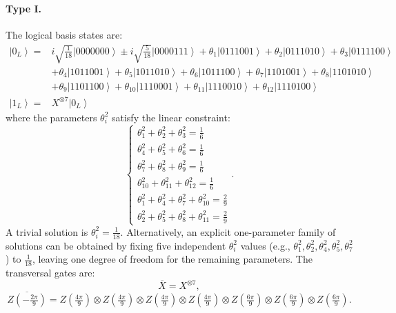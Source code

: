 \documentclass[8pt]{article}
\theoremstyle{definition}
\begin{document}
\paragraph{Type I.} The logical basis states are:
\begin{align*}
    \left|0_{L}\right\rangle = & i\sqrt{\frac{1}{18}}\left|0000000\right\rangle \pm i\sqrt{\frac{5}{18}}\left|0000111\right\rangle +\theta_{1}\left|0111001\right\rangle +\theta_{2}\left|0111010\right\rangle +\theta_{3}\left|0111100\right\rangle \\&+\theta_{4}\left|1011001\right\rangle +\theta_{5}\left|1011010\right\rangle +\theta_{6}\left|1011100\right\rangle +\theta_{7}\left|1101001\right\rangle +\theta_{8}\left|1101010\right\rangle \\
                               & +\theta_{9}\left|1101100\right\rangle +\theta_{10}\left|1110001\right\rangle +\theta_{11}\left|1110010\right\rangle +\theta_{12}\left|1110100\right\rangle                                                          \\
    \left|1_{L}\right\rangle = & X^{\otimes7}\left|0_{L}\right\rangle
\end{align*}
where the parameters \(\theta_i^2\) satisfy the linear constraint:
\[ \begin{cases}
        \theta_{1}^{2}+\theta_{2}^{2}+\theta_{3}^{2}=\frac{1}{6}                 \\
        \theta_{4}^{2}+\theta_{5}^{2}+\theta_{6}^{2}=\frac{1}{6}                 \\
        \theta_{7}^{2}+\theta_{8}^{2}+\theta_{9}^{2}=\frac{1}{6}                 \\
        \theta_{10}^{2}+\theta_{11}^{2}+\theta_{12}^{2}=\frac{1}{6}              \\
        \theta_{1}^{2}+\theta_{4}^{2}+\theta_{7}^{2}+\theta_{10}^{2}=\frac{2}{9} \\
        \theta_{2}^{2}+\theta_{5}^{2}+\theta_{8}^{2}+\theta_{11}^{2}=\frac{2}{9}
    \end{cases}. \]
A trivial solution is \(\theta_i^2 = \frac{1}{18}\). Alternatively, an explicit one-parameter family of solutions can be obtained by fixing five independent \(\theta_i^2\) values (e.g., \(\theta_1^2, \theta_2^2, \theta_4^2, \theta_5^2, \theta_7^2\)) to \(\frac{1}{18}\), leaving one degree of freedom for the remaining parameters. The transversal gates are:
\[ \overline{X}=X^{\otimes7}, \]
\[ \overline{Z\left(-\tfrac{2\pi}{9}\right)}=Z\left(\tfrac{4\pi}{9}\right)\otimes Z\left(\tfrac{4\pi}{9}\right)\otimes Z\left(\tfrac{4\pi}{9}\right)\otimes Z\left(\tfrac{4\pi}{9}\right)\otimes Z\left(\tfrac{6\pi}{9}\right)\otimes Z\left(\tfrac{6\pi}{9}\right)\otimes Z\left(\tfrac{6\pi}{9}\right). \]
\end{document}
